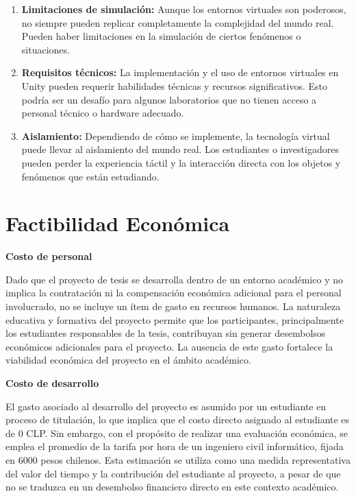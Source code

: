 \begin{enumerate}
    \item \textbf{Limitaciones de simulación:} Aunque los entornos virtuales son poderosos, no siempre pueden replicar completamente la complejidad del mundo real. Pueden haber limitaciones en la simulación de ciertos fenómenos o situaciones.
    
    \item \textbf{Requisitos técnicos:} La implementación y el uso de entornos virtuales en Unity pueden requerir habilidades técnicas y recursos significativos. Esto podría ser un desafío para algunos laboratorios que no tienen acceso a personal técnico o hardware adecuado.
    
    \item \textbf{Aislamiento:} Dependiendo de cómo se implemente, la tecnología virtual puede llevar al aislamiento del mundo real. Los estudiantes o investigadores pueden perder la experiencia táctil y la interacción directa con los objetos y fenómenos que están estudiando.
    
\end{enumerate}

\section{Factibilidad Económica}

\textbf{Costo de personal}

Dado que el proyecto de tesis se desarrolla dentro de un entorno académico y no implica la contratación ni la compensación económica adicional para el personal involucrado, no se incluye un ítem de gasto en recursos humanos. La naturaleza educativa y formativa del proyecto permite que los participantes, principalmente los estudiantes responsables de la tesis, contribuyan sin generar desembolsos económicos adicionales para el proyecto. La ausencia de este gasto fortalece la viabilidad económica del proyecto en el ámbito académico.

\textbf{Costo de desarrollo}

El gasto asociado al desarrollo del proyecto es asumido por un estudiante en proceso de titulación, lo que implica que el costo directo asignado al estudiante es de 0 CLP. Sin embargo, con el propósito de realizar una evaluación económica, se emplea el promedio de la tarifa por hora de un ingeniero civil informático, fijada en 6000 pesos chilenos. Esta estimación se utiliza como una medida representativa del valor del tiempo y la contribución del estudiante al proyecto, a pesar de que no se traduzca en un desembolso financiero directo en este contexto académico.

